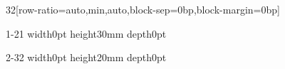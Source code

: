 \documentclass[paper={120mm,40mm}]{ropas-poster}
\begin{document}
\begin{postergrid}{3}{2}[row-ratio={auto,min,auto},block-sep=0bp,block-margin=0bp]
\begin{posterblock}{1-2}{1}
\noindent\vrule width0pt height30mm depth0pt
\end{posterblock}
\begin{posterblock}{2-3}{2}
\noindent\vrule width0pt height20mm depth0pt
\end{posterblock}
\end{postergrid}
\end{document}
